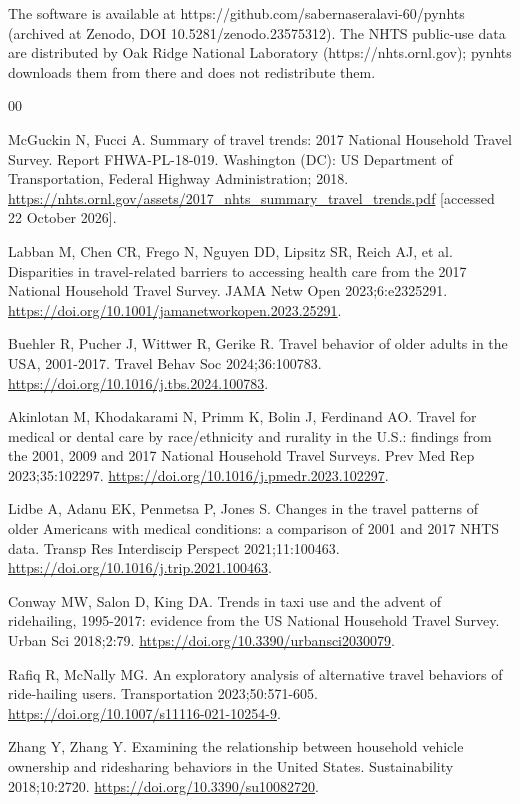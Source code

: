 \documentclass[preprint,12pt, a4paper]{elsarticle}
\begin{document}
The software is available at https://github.com/sabernaseralavi-60/pynhts (archived at Zenodo, DOI 10.5281/zenodo.23575312). The NHTS public-use data are distributed by Oak Ridge National Laboratory (https://nhts.ornl.gov); pynhts downloads them from there and does not redistribute them.

\begin{thebibliography}{00}

 McGuckin N, Fucci A. Summary of travel trends: 2017 National Household Travel Survey. Report FHWA-PL-18-019. Washington (DC): US Department of Transportation, Federal Highway Administration; 2018. \url{https://nhts.ornl.gov/assets/2017_nhts_summary_travel_trends.pdf} [accessed 22 October 2026].

 Labban M, Chen CR, Frego N, Nguyen DD, Lipsitz SR, Reich AJ, et al. Disparities in travel-related barriers to accessing health care from the 2017 National Household Travel Survey. JAMA Netw Open 2023;6:e2325291. \url{https://doi.org/10.1001/jamanetworkopen.2023.25291}.

 Buehler R, Pucher J, Wittwer R, Gerike R. Travel behavior of older adults in the USA, 2001-2017. Travel Behav Soc 2024;36:100783. \url{https://doi.org/10.1016/j.tbs.2024.100783}.

 Akinlotan M, Khodakarami N, Primm K, Bolin J, Ferdinand AO. Travel for medical or dental care by race/ethnicity and rurality in the U.S.: findings from the 2001, 2009 and 2017 National Household Travel Surveys. Prev Med Rep 2023;35:102297. \url{https://doi.org/10.1016/j.pmedr.2023.102297}.

 Lidbe A, Adanu EK, Penmetsa P, Jones S. Changes in the travel patterns of older Americans with medical conditions: a comparison of 2001 and 2017 NHTS data. Transp Res Interdiscip Perspect 2021;11:100463. \url{https://doi.org/10.1016/j.trip.2021.100463}.

 Conway MW, Salon D, King DA. Trends in taxi use and the advent of ridehailing, 1995-2017: evidence from the US National Household Travel Survey. Urban Sci 2018;2:79. \url{https://doi.org/10.3390/urbansci2030079}.

 Rafiq R, McNally MG. An exploratory analysis of alternative travel behaviors of ride-hailing users. Transportation 2023;50:571-605. \url{https://doi.org/10.1007/s11116-021-10254-9}.

 Zhang Y, Zhang Y. Examining the relationship between household vehicle ownership and ridesharing behaviors in the United States. Sustainability 2018;10:2720. \url{https://doi.org/10.3390/su10082720}.


\end{thebibliography}
\end{document}
